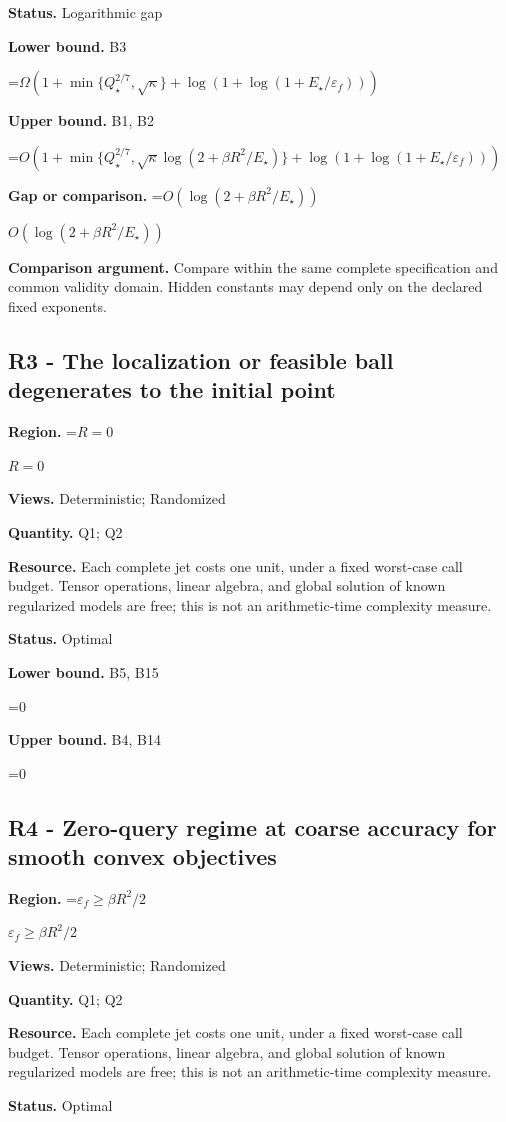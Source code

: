 \documentclass[10pt,a4paper]{article}
\newcommand{\AtlasMath}[1]{\par\begingroup\centering\setbox0=\hbox{$\displaystyle #1$}\ifdim\wd0>1.4\linewidth\typeout{ATLAS WIDE FORMULA: \the\wd0}\fi\ifdim\wd0>\linewidth\resizebox{\linewidth}{!}{\box0}\else\box0\fi\par\endgroup}
\newcommand{\AtlasInlineMath}[1]{\begingroup\setbox0=\hbox{$#1$}\ifdim\wd0>.4\linewidth\endgroup\AtlasMath{#1}\else\endgroup$#1$\fi}
\begin{document}
\textbf{Status.} Logarithmic gap

\textbf{Lower bound.} B3

\AtlasMath{\Omega(1+\min\{Q_\star^{2/7},\sqrt\kappa\}+\log(1+\log(1+E_\star/\varepsilon_f)))}
\textbf{Upper bound.} B1, B2

\AtlasMath{O(1+\min\{Q_\star^{2/7},\sqrt\kappa\log(2+\beta R^2/E_\star)\}+\log(1+\log(1+E_\star/\varepsilon_f)))}
\textbf{Gap or comparison.} \AtlasInlineMath{O(\log(2+\beta R^2/E_\star))}

\textbf{Comparison argument.} Compare within the same complete specification and common validity domain. Hidden constants may depend only on the declared fixed exponents.

\subsection{R3 - The localization or feasible ball degenerates to the initial point}
\textbf{Region.} \AtlasInlineMath{R=0}

\textbf{Views.} Deterministic; Randomized

\textbf{Quantity.} Q1; Q2

\textbf{Resource.} Each complete jet costs one unit, under a fixed worst-case call budget. Tensor operations, linear algebra, and global solution of known regularized models are free; this is not an arithmetic-time complexity measure.

\textbf{Status.} Optimal

\textbf{Lower bound.} B5, B15

\AtlasMath{0}
\textbf{Upper bound.} B4, B14

\AtlasMath{0}
\subsection{R4 - Zero-query regime at coarse accuracy for smooth convex objectives}
\textbf{Region.} \AtlasInlineMath{\varepsilon_f\ge\beta R^2/2}

\textbf{Views.} Deterministic; Randomized

\textbf{Quantity.} Q1; Q2

\textbf{Resource.} Each complete jet costs one unit, under a fixed worst-case call budget. Tensor operations, linear algebra, and global solution of known regularized models are free; this is not an arithmetic-time complexity measure.

\textbf{Status.} Optimal
\end{document}
